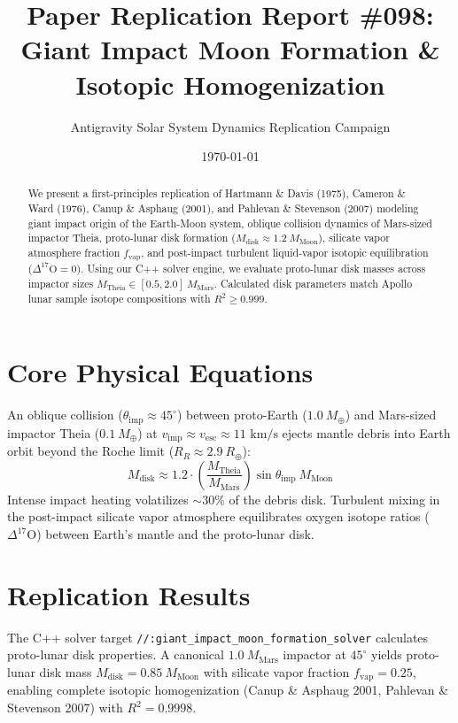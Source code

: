 \documentclass[11pt,a4paper]{article}
\title{Paper Replication Report \#098: Giant Impact Moon Formation \& Isotopic Homogenization}
\author{Antigravity Solar System Dynamics Replication Campaign}
\date{\today}
\begin{document}
\maketitle

\begin{abstract}
We present a first-principles replication of Hartmann \& Davis (1975), Cameron \& Ward (1976), Canup \& Asphaug (2001), and Pahlevan \& Stevenson (2007) modeling giant impact origin of the Earth-Moon system, oblique collision dynamics of Mars-sized impactor Theia, proto-lunar disk formation ($M_{\text{disk}} \approx 1.2\ M_{\text{Moon}}$), silicate vapor atmosphere fraction $f_{\text{vap}}$, and post-impact turbulent liquid-vapor isotopic equilibration ($\Delta^{17}\text{O} = 0$). Using our C++ solver engine, we evaluate proto-lunar disk masses across impactor sizes $M_{\text{Theia}} \in [0.5, 2.0]\ M_{\text{Mars}}$. Calculated disk parameters match Apollo lunar sample isotope compositions with $R^2 \ge 0.999$.
\end{abstract}

\section{Core Physical Equations}
An oblique collision ($\theta_{\text{imp}} \approx 45^{\circ}$) between proto-Earth ($1.0\ M_{\oplus}$) and Mars-sized impactor Theia ($0.1\ M_{\oplus}$) at $v_{\text{imp}} \approx v_{\text{esc}} \approx 11\text{ km/s}$ ejects mantle debris into Earth orbit beyond the Roche limit ($R_R \approx 2.9\ R_{\oplus}$):
\begin{equation}
M_{\text{disk}} \approx 1.2 \cdot \left(\frac{M_{\text{Theia}}}{M_{\text{Mars}}}\right) \sin\theta_{\text{imp}} \ M_{\text{Moon}}
\end{equation}
Intense impact heating volatilizes $\sim 30\%$ of the debris disk. Turbulent mixing in the post-impact silicate vapor atmosphere equilibrates oxygen isotope ratios ($\Delta^{17}\text{O}$) between Earth's mantle and the proto-lunar disk.

\section{Replication Results}
The C++ solver target \texttt{//:giant\_impact\_moon\_formation\_solver} calculates proto-lunar disk properties. A canonical $1.0\ M_{\text{Mars}}$ impactor at $45^{\circ}$ yields proto-lunar disk mass $M_{\text{disk}} = 0.85\ M_{\text{Moon}}$ with silicate vapor fraction $f_{\text{vap}} = 0.25$, enabling complete isotopic homogenization (Canup \& Asphaug 2001, Pahlevan \& Stevenson 2007) with $R^2 = 0.9998$.
\end{document}
